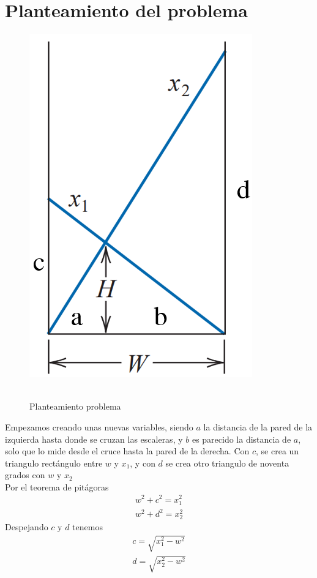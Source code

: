 \documentclass[ceqn,10pt]{SelfArx}
\begin{document}
\section{Planteamiento del problema}
\begin{figure}[ht]\centering
	\includegraphics[scale=0.4]{planteamiento.png}\\\
	\caption{Planteamiento problema}
	\label{fig:planteamiento}
\end{figure}
Empezamos creando unas nuevas variables, siendo $a$ la distancia de la pared
de la izquierda hasta donde se cruzan las escaleras, y $b$ es parecido la
distancia de $a$, solo que lo mide desde el cruce hasta la pared de la
derecha. Con $c$, se crea un triangulo rectángulo entre $w$ y
$x_{1}$, y con $d$ se crea otro triangulo de noventa grados con $w$ y
$x_{2}$\\
Por el teorema de pitágoras
\begin{equation} \label{eq:pitagoras}
\begin{aligned}
	w^2+c^2=x_{1}^2\\
	w^2+d^2=x_{2}^2
\end{aligned}
\end{equation}
Despejando $c$ y $d$ tenemos
\begin{equation} \label{eq:pitagoras2}
\begin{aligned}
	c=\sqrt{x_{1}^2-w^2}\\
	d=\sqrt{x_{2}^2-w^2}
\end{aligned}
\end{equation}
\end{document}
